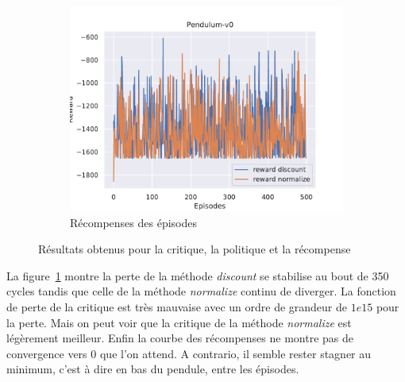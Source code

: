 \begin{figure}[H]
\begin{subfigure}{0.3\textwidth}
    \end{subfigure}
    \begin{subfigure}{0.3\textwidth}
        \includegraphics[width=\textwidth]{figures/iteration1/rewards_Pendulum-v0_pg_dataset_td_eval_True_cycles_500_trajs_20_batches_20_gamma_0.99_nstep_5_lr_act_0.01_lr_critic_0.01.pdf}
        \caption{Récompenses des épisodes}
    \end{subfigure}
    \caption{Résultats obtenus pour la critique, la politique et la récompense}
    \label{fig:attempt1_results}
\end{figure}

La figure~\ref{fig:attempt1_results} montre la perte de la méthode \emph{discount} se stabilise au bout de 350 cycles tandis que celle de la méthode \emph{normalize} continu de diverger. La fonction de perte de la critique est très mauvaise avec un ordre de grandeur de $1e15$ pour la perte. Mais on peut voir que la critique de la méthode \emph{normalize} est légèrement meilleur. Enfin la courbe des récompenses ne montre pas de convergence vers 0 que l'on attend. A contrario, il semble rester stagner au minimum, c'est à dire en bas du pendule, entre les épisodes.
